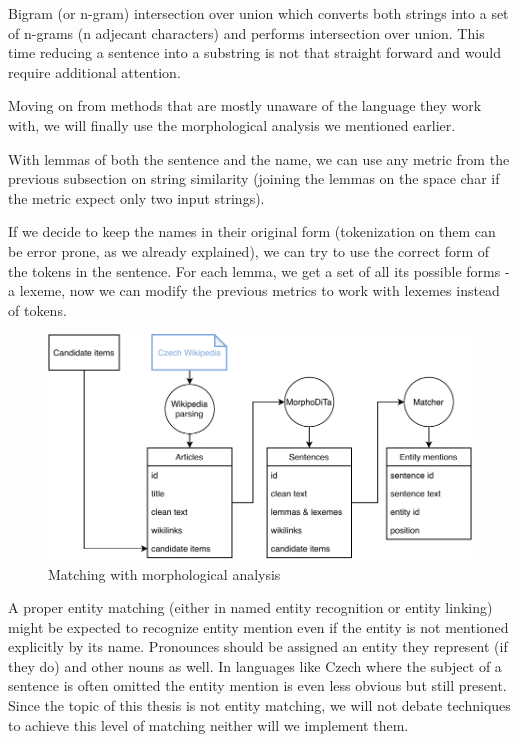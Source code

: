 Bigram (or n-gram) intersection over union which converts both strings into a set of n-grams (n adjecant characters) and performs intersection over union. This time reducing a sentence into a substring is not that straight forward and would require additional attention.


Moving on from methods that are mostly unaware of the language they work with, we will finally use the morphological analysis we mentioned earlier.

With lemmas of both the sentence and the name, we can use any metric from the previous subsection on string similarity (joining the lemmas on the space char if the metric expect only two input strings).

If we decide to keep the names in their original form (tokenization on them can be error prone, as we already explained), we can try to use the correct form of the tokens in the sentence. For each lemma, we get a set of all its possible forms - a lexeme, now we can modify the previous metrics to work with lexemes instead of tokens. 


\begin{figure}[h]\centering
\includegraphics[width=140mm]{./img/Diplomka diagramy-Detailed_text}
\caption{Matching with morphological analysis}
\label{obr:DiagramTextDetail}
\end{figure}



A proper entity matching (either in named entity recognition or entity linking) might be expected to recognize entity mention even if the entity is not mentioned explicitly by its name. Pronounces should be assigned an entity they represent (if they do) and other nouns as well. In languages like Czech where the subject of a sentence is often omitted the entity mention is even less obvious but still present. Since the topic of this thesis is not entity matching, we will not debate techniques to achieve this level of matching neither will we implement them.

